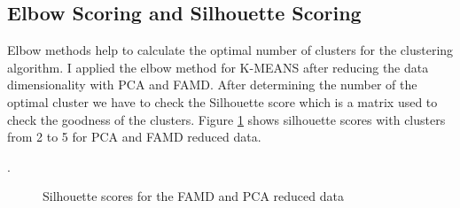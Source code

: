 \documentclass[12pt]{article}
\begin{document}
\subsection{Elbow Scoring and Silhouette Scoring}
Elbow methods help to calculate the optimal number of clusters for the clustering algorithm. I applied the elbow method for K-MEANS after reducing the data dimensionality with PCA and FAMD. After determining the number of the optimal cluster we have to check the Silhouette score which is a matrix used to check the goodness of the clusters. Figure \ref {fig:scores} shows silhouette scores with clusters from 2 to 5 for PCA and FAMD reduced data.

.
\begin{figure}[h!]
	\centering
	\qquad
	\caption{Silhouette scores for the FAMD and PCA reduced data}%
	\label{fig:scores}%
\end{figure}
\end{document}
